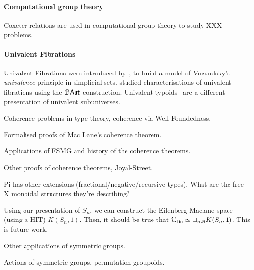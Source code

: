 \paragraph{Computational group theory} Coxeter relations are used in computational group theory to study XXX problems.

\paragraph{Univalent Fibrations} Univalent Fibrations were introduced by~\citet*{kapulkinUnivalenceSimplicialSets2018},
to build a model of Voevodsky's \emph{univalence} principle in simplicial sets.
\citet{christensenCharacterizationUnivalentFibrations2015} studied characterisations of univalent fibrations using the
$\BAut$ construction. Univalent typoids~\cite{petrakisUnivalentTypoids2019a} are a different presentation of univalent
subuniverses.

Coherence problems in type theory, coherence via Well-Foundedness.

Formalised proofs of Mac Lane's coherence theorem.

Applications of FSMG and history of the coherence theorems.

Other proofs of coherence theorems, Joyal-Street.

Pi has other extensions (fractional/negative/recursive types).
What are the free X monoidal structures they're describing?

Using our presentation of $S_{n}$, we can construct the Eilenberg-Maclane space (using a HIT) $K(S_{n},1)$. Then, it
should be true that $\UFin \eqv \sqcup_{n:\Nat} K(S_{n},1)$. This is future work.

Other applications of symmetric groups.

Actions of symmetric groups, permutation groupoids.

